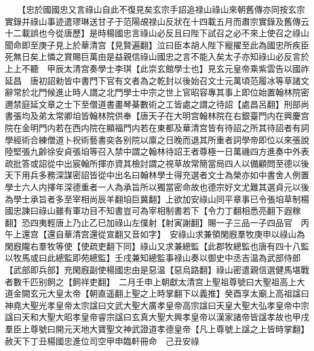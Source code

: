 　　【忠於國國忠又言祿山自此不復見矣玄宗手詔追禄山祿山來朝舊傳亦同按玄宗實錄并祿山事迹遣璆琳送甘子于范陽覘禄山反狀在十四載五月而肅宗實錄及舊傳云十二載誤也今從唐歷】是時楊國忠言祿山必反且曰陛下試召之必不來上使召之祿山聞命即至庚子見上於華清宫【見賢遍翻】泣曰臣本胡人陛下寵擢至此為國忠所疾臣死無日矣上憐之賞賜巨萬由是益親信祿山國忠之言不能入矣太子亦知祿山必反言於上上不聽　甲辰太清宫奏學士李琪【此崇玄館學士也】見玄元皇帝乘紫雲告以國祚延昌　唐初詔勑皆中書門下官有文者為之乾封以後始召文士元萬頃范履冰等草諸文辭常於北門候進止時人謂之北門學士中宗之世上官昭容專其事上即位始置翰林院密邇禁庭延文章之士下至僧道書畫琴棊數術之工皆處之謂之待詔【處昌呂翻】刑部尚書張均及弟太常卿垍皆翰林院供奉【唐天子在大明宫翰林院在右銀臺門内在興慶宫院在金明門内若在西内院在顯福門内若在東都及華清宫皆有待詔之所其待詔者有詞學經術合練僧道卜祝術藝書奕各别院以廪之日晚而退其所重者詞學帝即位以來張說陸堅張九齡徐安貞張垍等召入禁中謂之翰林待詔王者尊極一日萬禨四方進奏中外表疏批答或詔從中出宸翰所揮亦資其檢討謂之視草故常簡當局四人以備顧問至德以後天下用兵多務深謀密詔皆從中出名曰翰林學士得充選者文士為榮亦如中書舍人例置學士六人内擇年深德重者一人為承旨所以獨當密命故也德宗好文尤難其選貞元以後為學士承旨者多至宰相尚辰羊翻垍巨冀翻】上欲加安祿山同平章事已令張垍草制楊國忠諫曰祿山雖有軍功目不知書豈可為宰相制書若下【令力丁翻相悉亮翻下遐稼翻】恐四夷輕唐上乃止乙巳加祿山左僕射【射寅謝翻】賜一子三品一子四品官　丙午上還宫【還自華清宫還從宣翻又音如字】　安祿山求兼領閑廐羣牧庚申以祿山為閑廐隴右羣牧等使【使疏吏翻下同】祿山又求兼總監【此郡牧總監也唐有四十八監以牧馬或曰此總監即苑總監】壬戌兼知總監事禄山奏以御史中丞吉温為武部侍郎【武部即兵部】充閑廐副使楊國忠由是惡温【惡烏路翻】祿山密遣親信選健馬堪戰者數千匹别飼之【飼祥吏翻】　二月壬申上朝獻太清宫上聖祖尊號曰大聖祖高上大道金闕玄元大皇太帝【朝直遥翻上聖之上時掌翻下以義推】癸酉享太廟上高祖諡曰神堯大聖光孝皇帝太宗諡曰文武大聖大廣孝皇帝高宗諡曰天皇大聖大弘孝皇帝中宗諡曰天和大聖大昭孝皇帝睿宗諡曰玄真大聖大興孝皇帝以漢家諸帝皆諡孝故也甲戌羣臣上尊號曰開元天地大寶聖文神武證道孝德皇帝【凡上尊號上諡之上皆時掌翻】赦天下丁丑楊國忠進位司空甲申臨軒冊命　己丑安祿

